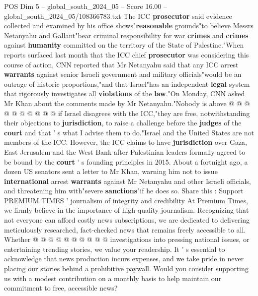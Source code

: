 \begin{textsample}{POS Dim 5 – global\_south\_2024\_05 – Score 16.00 – global\_south\_2024\_05/108366783.txt}
The ICC \textbf{prosecutor} said evidence collected and examined by his office shows"\textbf{reasonable} grounds"to believe Messrs Netanyahu and Gallant"bear criminal responsibility for war \textbf{crimes} and \textbf{crimes} against \textbf{humanity} committed on the territory of the State of Palestine."When reports surfaced last month that the ICC chief \textbf{prosecutor} was considering this course of action, CNN reported that Mr Netanyahu said that any ICC arrest \textbf{warrants} against senior Israeli government and military officials"would be an outrage of historic proportions,"and that Israel"has an independent \textbf{legal} system that rigorously investigates all \textbf{violations} of the \textbf{law}."On Monday, CNN asked Mr Khan about the comments made by Mr Netanyahu."Nobody is above @ @ @ @ @ @ @ @ @ @ if Israel disagrees with the ICC,"they are free, notwithstanding their objections to \textbf{jurisdiction}, to raise a challenge before the \textbf{judges} of the \textbf{court} and that ' s what I advise them to do."Israel and the United States are not members of the ICC.
However, the ICC claims to have \textbf{jurisdiction} over Gaza, East Jerusalem and the West Bank after Palestinian leaders formally agreed to be bound by the \textbf{court} ' s founding principles in 2015.
About a fortnight ago, a dozen US senators sent a letter to Mr Khan, warning him not to issue \textbf{international} arrest \textbf{warrants} against Mr Netanyahu and other Israeli officials, and threatening him with"severe \textbf{sanctions}"if he does so.
Share this : Support PREMIUM TIMES ' journalism of integrity and credibility At Premium Times, we firmly believe in the importance of high-quality journalism.
Recognizing that not everyone can afford costly news subscriptions, we are dedicated to delivering meticulously researched, fact-checked news that remains freely accessible to all.
Whether @ @ @ @ @ @ @ @ @ @ investigations into pressing national issues, or entertaining trending stories, we value your readership.
It ' s essential to acknowledge that news production incurs expenses, and we take pride in never placing our stories behind a prohibitive paywall.
Would you consider supporting us with a modest contribution on a monthly basis to help maintain our commitment to free, accessible news?

\end{textsample}
